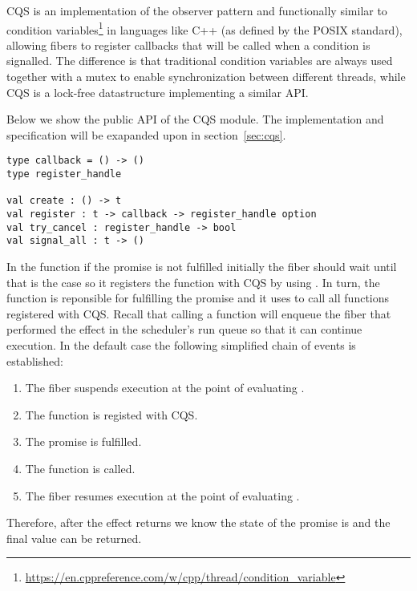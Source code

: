 CQS is an implementation of the observer pattern and functionally similar to condition variables\footnote{\url{https://en.cppreference.com/w/cpp/thread/condition_variable}} in languages like C++ (as defined by the POSIX standard), allowing fibers to register callbacks that will be called when a condition is signalled.
The difference is that traditional condition variables are always used together with a mutex to enable synchronization between different threads, while CQS is a lock-free datastructure implementing a similar API.

Below we show the public API of the CQS module. The implementation and specification will be exapanded upon in section~\ref{sec:cqs}.
\begin{verbatim}
type callback = () -> ()
type register_handle

val create : () -> t
val register : t -> callback -> register_handle option
val try_cancel : register_handle -> bool
val signal_all : t -> ()
\end{verbatim}

In the  function if the promise is not fulfilled initially the fiber should wait until that is the case so it registers the  function with CQS by using .
In turn, the  function is reponsible for fulfilling the promise and it uses  to call all  functions registered with CQS.
Recall that calling a  function will enqueue the fiber that performed the \esuspend{} effect in the scheduler's run queue so that it can continue execution.
In the default case the following simplified chain of events is established:
\begin{enumerate}
  \item The fiber suspends execution at the point of evaluating .
  \item The  function is registed with CQS.
  \item The promise is fulfilled.
  \item The  function is called.
  \item The fiber resumes execution at the point of evaluating .
\end{enumerate}
Therefore, after the \esuspend{} effect returns we know the state of the promise is  and the final value can be returned.

